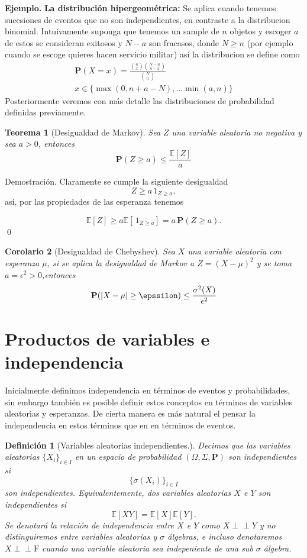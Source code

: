 \documentclass[letterpaper]{book}
\newcommand{\ind}{\perp\!\!\!\!\perp}
\newtheorem{teorema}{Teorema}[section]
\newtheorem{cor}[teorema]{Corolario}
\newtheorem{def.}{Definici\'on}[section]
\newcommand{\prob}{\textbf{P}}
\newcommand{\esp}{\mathbb E}
\newcommand{\exe}{{\newline \noindent \sc \textbf{Ejemplo. }}}
\newcommand{\dem}{{\noindent \sc Demostraci\'on. }}
\newcommand{\om}{\ensuremath{\Omega}}
\newcommand{\sig}{\ensuremath{\Sigma}}
\begin{document}
\exe \textbf{La distribución hipergeométrica:} Se aplica cuando tenemos sucesiones de eventos que no son independientes, en contraste a la distribucion binomial. Intuivamente suponga que tenemos un sample de \(n\) objetos y escoger \(a\) de estos se consideran exitosos y \(N-a\) son fracasos, donde \(N \geq n\) (por ejemplo cuando se escoge quieres hacen servicio militar) así la distribucion se define como
\begin{align*}
\prob(X=x)=\frac{{a\choose x}{N-a\choose n-x}}{{N\choose n}}\\
x\in\{\max(0,n+a-N),\dots\min(a,n)\}
\end{align*}
Posteriormente veremos con más detalle las distribuciones de probabilidad definidas previamente.

\begin{teorema}[Desigualdad de Markov]
Sea $Z$ una variable aleatoria no negativa y sea $a>0$, entonces
\[
\prob(Z\geq a)\leq\frac{\esp[Z]}{a}
\]
\end{teorema}
\dem Claramente se cumple la siguiente desigualdad
\[
Z\geq a\,1_{Z\geq a},
\]
\noindent así, por las propiedades de las esperanza tenemos

\[
\esp[Z]\geq a\esp[\,1_{Z\geq a}]=a\,\prob(Z\geq a).
\]
\qed
\begin{cor}[Desigualdad de Chebyshev]
Sea $X$ una variable aleatoria con esperanza $\mu$, si se aplica la desigualdad de Markov a $Z=(X-\mu)^2$ y se toma $a=\epsilon^2>0$,entonces
\[
\prob(|X-\mu|\geq \epssilon)\leq \frac{\sigma^2(X)}{\epsilon^2}
\]
\end{cor}
\section{Productos de variables e independencia}
\label{sec:org71c1d10}
\noindent Inicialmente definimos independencia en términos de eventos y probabilidades, sin embargo también es posible definir estos conceptos en términos de variables aleatorias y esperanzas. De cierta manera es más natural el pensar la independencia en estos términos que en en términos de eventos. 

\begin{def.}[Variables aleatorias independientes.]
Decimos que las variables aleatorias \(\{X_i\}_{i\in I}\) en un espacio de probabilidad \((\om,\sig,\prob)\) son \emph{independientes} si \[\{\sigma(X_i)\}_{i\in I}\] son independientes. Equivalentemente, dos variables aleatorias \(X\) e \(Y\) son independientes si 
\[
\esp[XY]=\esp[X]\esp[Y].
\]
Se denotará la relación de independencia entre \(X\) e \(Y\) como \(X\ind Y\) y no distinguiremos entre variables aleatorias y \(\sigma\) álgebras, e incluso denotaremos \(X\ind\mathrm{F}\) cuando una variable aleatoria sea indepeniente de una sub \(\sigma\) álgebra.
\end{def.}
\end{document}

